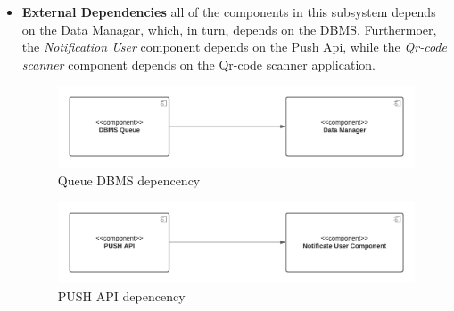 \begin{itemize}
    \item \textbf{External Dependencies}
    all of the components in this subsystem depends on the Data Managar, which, in turn, depends on the DBMS. Furthermoer, the \textit{Notification User} component depends on the Push Api, while the \textit{Qr-code scanner} component depends on the Qr-code scanner application.
    \begin{figure}[h!]
        \centering
        \includegraphics[width=.8\textwidth]{Images/TestDiagram/Queue/ExternalDepDBMS.png}
        \caption{\label{fig:QueueExternalDepDBMS}{Queue DBMS depencency}}
    \end{figure}
    \FloatBarrier  
    
    \begin{figure}[h!]
        \centering
        \includegraphics[width=.8\textwidth]{Images/TestDiagram/Queue/ExternalDepPUSH.png}
        \caption{\label{fig:QueueExternalDepPUSH}{PUSH API depencency}}
    \end{figure}
    \FloatBarrier  
    

\end{itemize}
